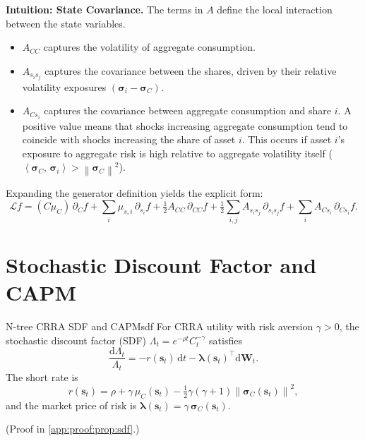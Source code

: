 \documentclass[11pt,letterpaper,oneside]{article}
\numberwithin{equation}{section}
\newcommand{\LeanMintedOptions}{fontsize=\footnotesize, breaklines, linenos, numbersep=0.85em}
\newcommand{\leanfile}[2][]{\inputminted[\LeanMintedOptions,##1]{lean4}{##2}}%
\newcommand{\leanfile}[2][]{}%
\newcommand{\leanfile}[2][]{}%
\newcommand{\1}{\mathbf{1}}
\newcommand{\diff}{\mathrm{d}}
\newcommand{\norm}[1]{\left\lVert #1\right\rVert}
\newcommand{\ip}[2]{\left\langle #1,\,#2\right\rangle}
\begin{document}
\begin{tcolorbox}[didacticstyle]
    \textbf{Intuition: State Covariance.}
    The terms in $A$ define the local interaction between the state variables.
    \begin{itemize}[leftmargin=1.25em]
        \item $A_{CC}$ captures the volatility of aggregate consumption.
        \item $A_{s_i s_j}$ captures the covariance between the shares, driven by their relative volatility exposures $(\bm{\sigma}_i - \bm{\sigma}_C)$.
        \item $A_{C s_i}$ captures the covariance between aggregate consumption and share $i$. A positive value means that shocks increasing aggregate consumption tend to coincide with shocks increasing the share of asset $i$. This occurs if asset $i$'s exposure to aggregate risk is high relative to aggregate volatility itself ($\ip{\bm{\sigma}_C}{\bm{\sigma}_i} > 
\norm{\bm{\sigma}_C}^2$).
    \end{itemize}
Expanding the generator definition yields the explicit form:
\[
  \mathcal{L}f = (C\mu_C) \,\partial_C f + \sum_i \mu_{s,i} \,\partial_{s_i} f + \tfrac12 A_{CC} \,\partial_{CC} f + \tfrac12 \sum_{i,j} A_{s_i s_j} \,\partial_{s_i s_j} f + \sum_i A_{C s_i} \,\partial_{C s_i} f.
\]
\end{tcolorbox}

\section{Stochastic Discount Factor and CAPM}\label{sec:sdf}

\begin{proposition}{N-tree CRRA SDF and CAPM}{sdf}
For CRRA utility with risk aversion $\gamma>0$, the stochastic discount factor (SDF) $\Lambda_t=e^{-\rho t}C_t^{-\gamma}$ satisfies
\begin{equation}\label{eq:sdf_drift}
  \frac{\diff \Lambda_t}{\Lambda_t}=-r(\bm{s}_t)\,\diff t-\bm{\lambda}(\bm{s}_t)^{\top}\diff \bm{W}_t.
\end{equation}
The short rate is
\[
  r(\bm{s}_t)=\rho+\gamma\,\mu_C(\bm{s}_t)-\tfrac12\gamma(\gamma+1)
\norm{\bm{\sigma}_C(\bm{s}_t)}^2,
\]
and the market price of risk is $\bm{\lambda}(\bm{s}_t)=\gamma\,\bm{\sigma}_C(\bm{s}_t)$.

(Proof in \cref{app:proof:prop:sdf}.)
\end{proposition}
\end{document}
